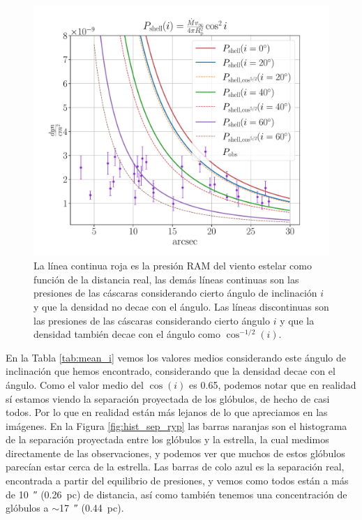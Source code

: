 \documentclass{book}
\begin{document}
\begin{figure}[htb]
    \centering
    \includegraphics[width=\textwidth]{imagenes_corregidas/S_2.pdf}
    \caption{La línea continua roja es la presión RAM del viento estelar como función de la distancia real, las demás líneas continuas son las presiones de las cáscaras considerando cierto ángulo de inclinación $i$ y que la densidad no decae con el ángulo. Las líneas discontinuas son las presiones de las cáscaras considerando cierto ángulo $i$ y que la densidad también decae con el ángulo como $\cos^{-1/2}(i)$.}
    \label{fig:ncos_2}
\end{figure}

En la Tabla \ref{tab:mean_i} vemos los valores medios considerando este ángulo de inclinación que hemos encontrado, considerando que la densidad decae con el ángulo. Como el valor medio del $\cos(i)$ es 0.65, podemos notar que en realidad sí estamos viendo la separación proyectada de los glóbulos, de hecho de casi todos. Por lo que en realidad están más lejanos de lo que apreciamos en las imágenes. En la Figura \ref{fig:hist_sep_ryp} las barras naranjas son el histograma de la separación proyectada entre los glóbulos y la estrella, la cual medimos directamente de las observaciones, y podemos ver que muchos de estos glóbulos parecían estar cerca de la estrella. Las barras de colo azul es la separación real, encontrada a partir del equilibrio de presiones, y vemos como todos están a más de \SI{10}{\arcsecond} (\SI{0.26}{pc}) de distancia, así como también tenemos una concentración de glóbulos a $\sim$\SI{17}{\arcsecond} (\SI{0.44}{pc}). 
\end{document}
